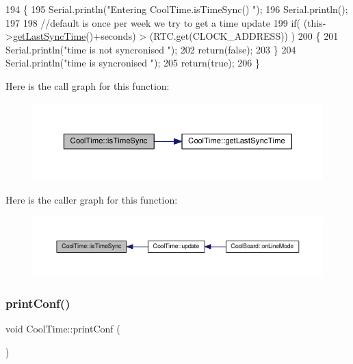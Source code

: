 \begin{DoxyCode}
194 \{
195     Serial.println(\textcolor{stringliteral}{"Entering CoolTime.isTimeSync() "});
196     Serial.println();
197 
198 \textcolor{comment}{//default is once per week we try to get a time update}
199     \textcolor{keywordflow}{if}( (this->\hyperlink{classCoolTime_a5d17f707a9d337720493b2bce9d41c21}{getLastSyncTime}()+seconds) > (RTC.get(CLOCK\_ADDRESS)) ) 
200     \{
201         Serial.println(\textcolor{stringliteral}{"time is not syncronised "});
202         \textcolor{keywordflow}{return}(\textcolor{keyword}{false});  
203     \}
204     Serial.println(\textcolor{stringliteral}{"time is syncronised "});
205     \textcolor{keywordflow}{return}(\textcolor{keyword}{true});
206 \}
\end{DoxyCode}
Here is the call graph for this function\+:
\nopagebreak
\begin{figure}[H]
\begin{center}
\leavevmode
\includegraphics[width=350pt]{classCoolTime_a5ae038a4498602b189f76a10bf02adf8_cgraph}
\end{center}
\end{figure}
Here is the caller graph for this function\+:
\nopagebreak
\begin{figure}[H]
\begin{center}
\leavevmode
\includegraphics[width=350pt]{classCoolTime_a5ae038a4498602b189f76a10bf02adf8_icgraph}
\end{center}
\end{figure}
\mbox{\label{classCoolTime_af355e7f9b3898211cd2ff25eab5933b1}} 
\subsubsection{\texorpdfstring{print\+Conf()}{printConf()}}
{\footnotesize\ttfamily void Cool\+Time\+::print\+Conf (\begin{DoxyParamCaption}{ }\end{DoxyParamCaption})}

